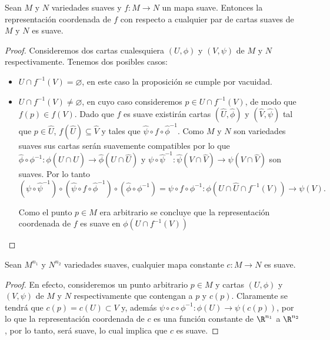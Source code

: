 \begin{theorem}\label{Teorema: Representación Suave}
	Sean $M$ y $N$ variedades suaves y $f: M \to N$ un mapa suave. Entonces la representación coordenada de $f$ con respecto a cualquier par de cartas suaves de $M$ y $N$ es suave.
\end{theorem}

\begin{proof}
	Consideremos dos cartas cualesquiera $(U,\phi)$ y $(V,\psi)$ de $M$ y $N$ respectivamente. Tenemos dos posibles casos:
	\begin{itemize}
		\item $U \cap f^{-1}(V) = \varnothing$, en este caso la proposición se cumple por vacuidad.
		\item $U \cap f^{-1}(V) \neq \varnothing$, en cuyo caso consideremos $p \in U \cap f^{-1}(V)$, de modo que $f(p) \in f(V)$. Dado que $f$ es suave existirán cartas $(\hat{U},\hat{\phi})$ y $(\hat{V},\hat{\psi})$ tal que $p \in \hat{U}$, $f(\hat{U})\subseteq \hat{V}$ y tales que $\hat{\psi} \circ f \circ \hat{\phi}^{-1}$. Como $M$ y $N$ son variedades suaves sus cartas serán suavemente compatibles por lo que $\hat{\phi} \circ \phi^{-1}: \phi(U \cap \hat{U}) \to \hat{\phi}(U \cap \hat{U})$ y $\psi \circ \hat{\psi}^{-1}: \hat{\psi}(V \cap \hat{V}) \to \psi(V \cap \hat{V})$ son suaves. Por lo tanto
		      \[
			      (\psi \circ \hat{\psi}^{-1}) \circ (\hat{\psi} \circ f \circ \hat{\phi}^{-1}) \circ (\hat{\phi} \circ \phi^{-1}) = \psi \circ f \circ \phi^{-1}: \phi(U \cap \hat{U} \cap f^{-1}(V)) \to \psi(V).
		      \]

		      Como el punto $p \in M$ era arbitrario se concluye que la representación coordenada de $f$ es suave en $\phi(U \cap f^{-1}(V))$
	\end{itemize}
\end{proof}


\begin{theorem}
	Sean $M^{n_1}$ y $N^{n_2}$ variedades suaves, cualquier mapa constante $c: M \to N$ es suave.
\end{theorem}

\begin{proof}
	En efecto, consideremos un punto arbitrario $p \in M$ y cartas $(U,\phi)$ y $(V,\psi)$ de $M$ y $N$ respectivamente que contengan a $p$ y $c(p)$. Claramente se tendrá que $c(p) = c(U) \subset V$ y, además $\psi \circ c \circ \phi^{-1}: \phi(U) \to \psi(c(p))$, por lo que la representación coordenada de $c$ es una función constante de $\R^{n_1}$ a $\R^{n_2}$, por lo tanto, será suave, lo cual implica que $c$ es suave.
\end{proof}

